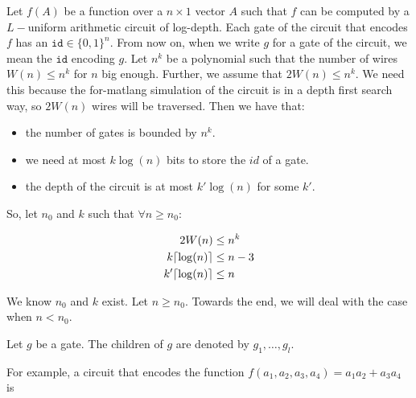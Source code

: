 Let $f(A)$ be a function over a $n\times 1$ vector $A$ such that $f$ can be computed by a $L-$uniform arithmetic circuit of log-depth. Each gate of the circuit that encodes $f$ has an $\texttt{id}\in\lbrace 0,1 \rbrace^n$. From now on, when we write $g$ for a gate of the circuit, we mean the $\texttt{id}$ encoding $g$.
Let $n^k$ be a polynomial such that the number of wires $W(n)\leq n^k$ for $n$ big enough. Further, we assume that $2W(n)\leq n^k$. We need this because the for-matlang simulation of the circuit is in a depth first search way, so $2W(n)$ wires will be traversed.
Then we have that:
\begin{itemize}
	\item the number of gates is bounded by $n^k$.
	\item we need at most $k\log (n)$ bits to store the $id$ of a gate.
	\item the depth of the circuit is at most $k'\log (n)$ for some $k'$.
\end{itemize}

So, let $n_0$ and $k$ such that $\forall n\geq n_0:$

\begin{align*}[right=\empheqrbrace (\star)]
    2W(n)&\leq n^k \\
	k \ceil{\log (n)} &\leq n-3 \\
	k' \ceil{\log(n)} &\leq n
\end{align*}

We know $n_0$ and $k$ exist. Let $n\geq n_0$. Towards the end, we will deal with the case when $n<n_0$.

Let $g$ be a gate. The children of $g$ are denoted by $g_1,\ldots, g_l$.
\begin{center}
\end{center}

For example, a circuit that encodes the function $f(a_1,a_2,a_3,a_4)=a_1a_2 +a_3a_4$ is 

\begin{center}
\end{center}

